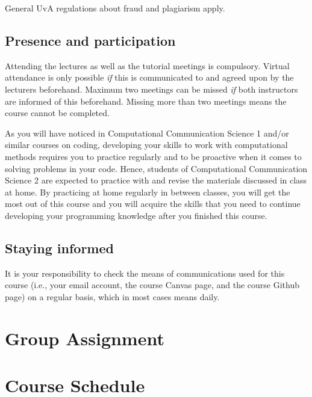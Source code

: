 \documentclass[a4paper,10pt,twocolumn]{report}
\begin{document}
	General UvA regulations about fraud and plagiarism apply.

	\section{Presence and participation}
	Attending the lectures as well as the tutorial meetings  is compulsory. Virtual attendance is only possible \emph{if} this is communicated to and agreed upon by the lecturers beforehand. Maximum two meetings can be missed \emph{if} both instructors are informed of this beforehand. Missing more than two meetings means the course cannot be completed. 
	
	As you will have noticed in Computational Communication Science 1 and/or similar courses on coding, developing your skills to work with computational methods requires you to practice regularly and to be proactive when it comes to solving problems in your code. Hence, students of Computational Communication Science 2 are expected to practice with and revise the materials discussed in class at home. By practicing at home regularly in between classes, you will get the most out of this course and you will acquire the skills that you need to continue developing your programming knowledge after you finished this course.
	
	\section{Staying informed}
	It is your responsibility to check the means of communications used for this course (i.e., your email account, the course Canvas page, and the course Github page) on a regular basis, which in most cases means daily.
	

	\chapter{Group Assignment}
\label{sec:groupassignment}

	
	
	\chapter{Course Schedule}
	
	
	
	
	
	
	
	
\end{document}
